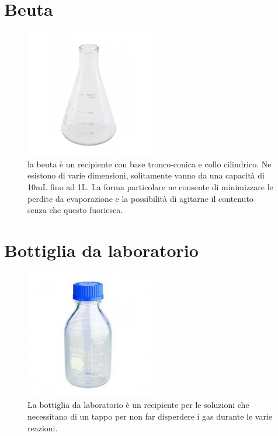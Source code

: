 \documentclass{report}
\begin{document}
	\vspace{0.5cm}


	\section{Beuta}

	\begin{figure}[H]

		\includegraphics[width=0.5\textwidth]{./immagini/beuta.jpg}
		\caption{la beuta è un recipiente con base tronco-conica e collo cilindrico.
		Ne esistono di varie dimensioni, solitamente vanno da una capacità di 10mL fino ad 1L.
		La forma particolare ne consente di minimizzare le perdite da evaporazione e la possibilità
		di agitarne il contenuto senza che questo fuoriesca.}
		\label{beuta}

	\end{figure}

	\vspace{0.5cm}

	\section{Bottiglia da laboratorio}

	\begin{figure}[H]

		\includegraphics[width=0.5\textwidth]{./immagini/bottiglia.JPG}
		\caption{La bottiglia da laboratorio è un recipiente per le soluzioni che
		necessitano di un tappo per non far disperdere
		i gas durante le varie reazioni.}
		\label{bottiglia}

	\end{figure}
\end{document}
